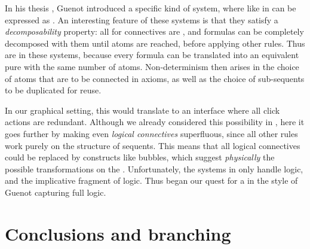 In his thesis \cite{guenot_nested_2013}, Guenot introduced a specific kind of
 system, where like in   can be expressed
as . An interesting feature of these systems is that they satisfy
a \emph{decomposability} property: all  for connectives are
\emph{}, and formulas can be completely decomposed with them until
atoms are reached, before applying other rules. Thus  are
\emph{} in these systems, because every formula can be translated into
an equivalent pure  with the same number of atoms. Non-determinism then
arises in the choice of atoms that are to be connected in axioms, as well as the
choice of sub-sequents to be duplicated for reuse.

In our graphical setting, this would translate to an interface where all click
actions are redundant. Although we already considered this possibility in
, here it goes further by making even \emph{logical
connectives} superfluous, since all other rules work purely on the structure of
sequents. This means that all logical connectives could be replaced by
 constructs like bubbles, which suggest \emph{physically} the
possible transformations on the .
Unfortunately, the systems in \cite{guenot_nested_2013} only handle 
logic, and the implicative fragment of  logic. Thus began our
quest for a  in the style of Guenot capturing full 
logic.


\section{Conclusions and branching}

